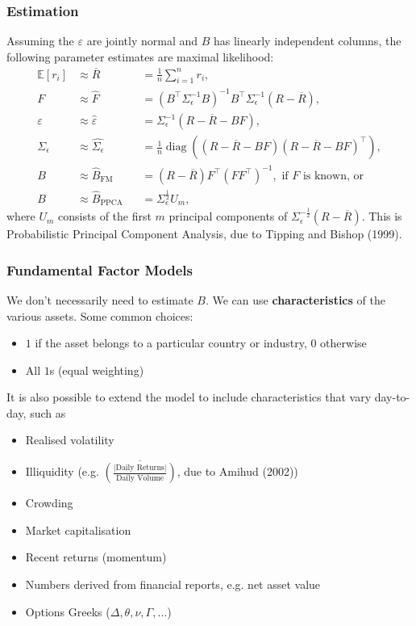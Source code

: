 \documentclass{article}
\DeclareMathOperator{\diag}{diag}
\begin{document}
\subsubsection{Estimation}
Assuming the $\varepsilon$ are jointly normal and $B$ has linearly independent columns, the following parameter estimates are maximal likelihood:
\begin{align*}
	\mathbb{E}[r_i]		&\approx \overline{R}		&&= \frac{1}{n}\sum_{i=1}^n r_i,
\\	F			&\approx \hat{F}		&&= (B^\top \Sigma_\epsilon^{-1} B)^{-1}B^\top \Sigma_\epsilon^{-1}(R-\overline{R}),
\\	\varepsilon		&\approx \hat{\varepsilon}	&&= \Sigma_\epsilon^{-1} (R-\overline{R}-BF),
\\	\Sigma_\epsilon		&\approx \hat{\Sigma_\epsilon}	&&= \frac{1}{n}\diag((R-\overline{R}-BF)(R-\overline{R}-BF)^\top),
\\	B			&\approx \hat{B}_{\textrm{FM}}	&&= (R-\overline{R})F^\top (FF^\top)^{-1},\textrm{ if }F\textrm{ is known, or}%
\\	B			&\approx \hat{B}_{\textrm{PPCA}}	&&= \Sigma_\epsilon^\frac{1}{2} U_m,%
\end{align*}
where $U_m$ consists of the first $m$ principal components of $\Sigma_\epsilon^{-\frac{1}{2}}(R-\overline{R})$. This is Probabilistic Principal Component Analysis, due to Tipping and Bishop (1999).

\subsubsection{Fundamental Factor Models}
We don't necessarily need to estimate $B$. We can use \textbf{characteristics} of the various assets. Some common choices:
\begin{itemize}
	\item $1$ if the asset belongs to a particular country or industry, $0$ otherwise
	\item All $1$s (equal weighting)
\end{itemize}

It is also possible to extend the model to include characteristics that vary day-to-day, such as
\begin{itemize}
	\item Realised volatility
	\item Illiquidity (e.g. $\overline{\left(\frac{\vert \textrm{Daily Returns}\vert}{\textrm{Daily Volume}}\right)}$, due to Amihud (2002))

	\item Crowding
	\item Market capitalisation
	\item Recent returns (momentum)%
	\item Numbers derived from financial reports, e.g. net asset value
	\item Options Greeks ($\Delta,\theta,\nu,\Gamma,\ldots$)
\end{itemize}
\end{document}
